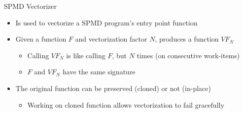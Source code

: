 

\begin{frame}{SPMD Vectorizer}

\begin{itemize}
    \item Is used to vectorize a SPMD program's entry point function
    \item Given a function $F$ and vectorization factor $N$, produces a function $VF_N$
    \begin{itemize}
        \item Calling $VF_N$ is like calling $F$, but $N$ times (on consecutive work-items)
        \item $F$ and $VF_N$ have the same signature
    \end{itemize}
    
    \item The original function can be preserved (cloned) or not (in-place)
    \begin{itemize}
        \item Working on cloned function allows vectorization to fail gracefully
    \end{itemize}
    
\end{itemize}

\vspace{-1.0ex}

\end{frame}

